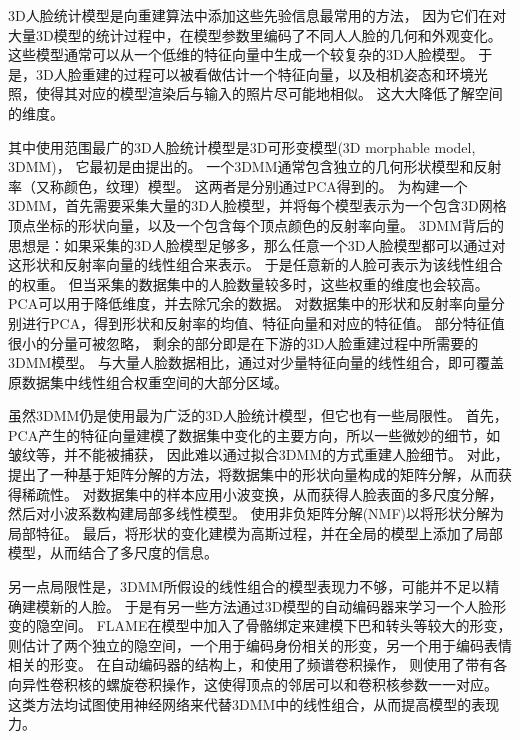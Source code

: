 3D人脸统计模型是向重建算法中添加这些先验信息最常用的方法，
因为它们在对大量3D模型的统计过程中，在模型参数里编码了不同人人脸的几何和外观变化。
这些模型通常可以从一个低维的特征向量中生成一个较复杂的3D人脸模型。
于是，3D人脸重建的过程可以被看做估计一个特征向量，以及相机姿态和环境光照，使得其对应的模型渲染后与输入的照片尽可能地相似。
这大大降低了解空间的维度。

其中使用范围最广的3D人脸统计模型是3D可形变模型(3D morphable model, 3DMM)，
它最初是由\citet{3DMM}提出的。
一个3DMM通常包含独立的几何形状模型和反射率（又称颜色，纹理）模型。
这两者是分别通过PCA得到的。
为构建一个3DMM，首先需要采集大量的3D人脸模型，并将每个模型表示为一个包含3D网格顶点坐标的形状向量，以及一个包含每个顶点颜色的反射率向量。
3DMM背后的思想是：如果采集的3D人脸模型足够多，那么任意一个3D人脸模型都可以通过对这形状和反射率向量的线性组合来表示。
于是任意新的人脸可表示为该线性组合的权重。
但当采集的数据集中的人脸数量较多时，这些权重的维度也会较高。
PCA可以用于降低维度，并去除冗余的数据。
对数据集中的形状和反射率向量分别进行PCA，得到形状和反射率的均值、特征向量和对应的特征值。
部分特征值很小的分量可被忽略，
剩余的部分即是在下游的3D人脸重建过程中所需要的3DMM模型。
与大量人脸数据相比，通过对少量特征向量的线性组合，即可覆盖原数据集中线性组合权重空间的大部分区域。

虽然3DMM仍是使用最为广泛的3D人脸统计模型，但它也有一些局限性。
首先，PCA产生的特征向量建模了数据集中变化的主要方向，所以一些微妙的细节，如皱纹等，并不能被捕获，
因此难以通过拟合3DMM的方式重建人脸细节。
对此，\citet{ferrari2017dictionary}提出了一种基于矩阵分解的方法，将数据集中的形状向量构成的矩阵分解，从而获得稀疏性。
\citet{brunton2014multilinear}对数据集中的样本应用小波变换，从而获得人脸表面的多尺度分解，然后对小波系数构建局部多线性模型。
\citet{jin2017robust}使用非负矩阵分解(NMF)以将形状分解为局部特征。
最后，\citet{luthi2017gaussian}将形状的变化建模为高斯过程，并在全局的模型上添加了局部模型，从而结合了多尺度的信息。

另一点局限性是，3DMM所假设的线性组合的模型表现力不够，可能并不足以精确建模新的人脸。
于是有另一些方法通过3D模型的自动编码器来学习一个人脸形变的隐空间。
FLAME\citep{FLAME}在模型中加入了骨骼绑定来建模下巴和转头等较大的形变，
\citet{jiang2019disentangled}则估计了两个独立的隐空间，一个用于编码身份相关的形变，另一个用于编码表情相关的形变。
在自动编码器的结构上，\citet{ranjan2018generating}和\citet{jiang2019disentangled}使用了频谱卷积操作，
\citet{bouritsas2019neural}则使用了带有各向异性卷积核的螺旋卷积操作，这使得顶点的邻居可以和卷积核参数一一对应。
这类方法均试图使用神经网络来代替3DMM中的线性组合，从而提高模型的表现力。

